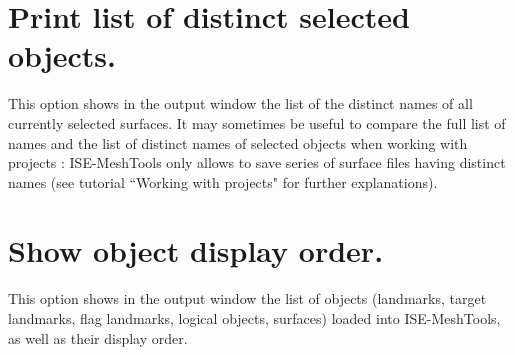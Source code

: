 \section{Print list of distinct selected objects.}
This option shows in the output window the list of the distinct names of all currently selected
surfaces. It may sometimes be useful to compare the full list of names and the list of distinct names
of selected objects when working with projects : ISE-MeshTools only allows to save series of surface
files having distinct names (see tutorial ``Working with projects" for further explanations).
\section{Show object display order.}
This option shows in the output window the list of objects (landmarks, target landmarks, flag landmarks, logical objects, surfaces) loaded into ISE-MeshTools, as well as their display order.
